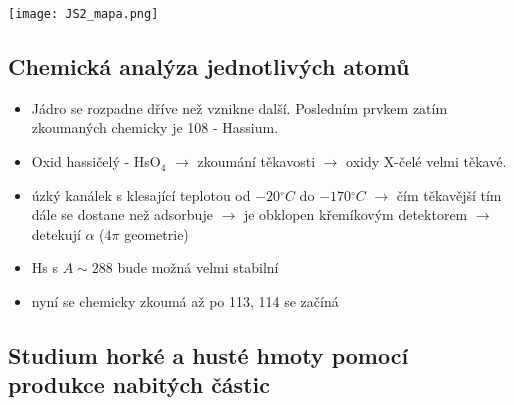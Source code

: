 \documentclass[../../main.tex]{subfiles}
\begin{document}
\begin{center}
	\texttt{[image: JS2\_mapa.png]}
\end{center}

\subsection{Chemická analýza jednotlivých atomů}

\begin{itemize}
    \item Jádro se rozpadne dříve než vznikne další. Posledním prvkem zatím zkoumaných chemicky je 108 - Hassium. 
     \item Oxid hassičelý - HsO$_4$ $\rightarrow$ zkoumání těkavosti $\rightarrow$ oxidy X-čelé velmi těkavé.
     \item úzký kanálek s klesající teplotou od $-20\unit{^\circ C}$ do $- 170\unit{^\circ C}$ $\rightarrow$ čím těkavější tím dále se dostane než adsorbuje $\rightarrow$ je obklopen křemíkovým detektorem $\rightarrow$ detekují $\alpha$ ($4 \pi $ geometrie)
     \item Hs s $A \sim 288$ bude možná velmi stabilní
     \item nyní se chemicky zkoumá až po 113, 114 se začíná
 \end{itemize}

\subsection{Studium horké a husté hmoty pomocí produkce nabitých částic}
\end{document}
